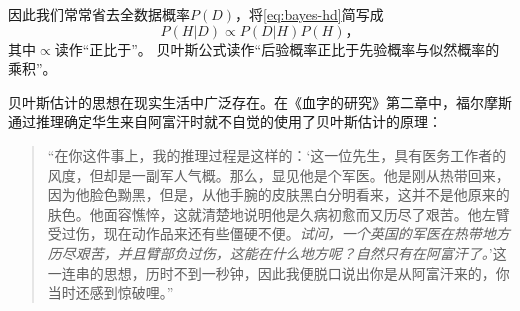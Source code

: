 因此我们常常省去全数据概率$P(D)$，将\cref{eq:bayes-hd}简写成
\begin{equation}\label{eq:bayes-propto}
    P(H|D)\propto P(D|H)P(H)，
\end{equation}
其中$\propto$读作“正比于”。
贝叶斯公式读作“后验概率正比于先验概率与似然概率的乘积”。

贝叶斯估计的思想在现实生活中广泛存在。在《血字的研究》第二章中，福尔摩斯通过推理确定华生来自阿富汗时就不自觉的使用了贝叶斯估计的原理：
\begin{quotation}
    “在你这件事上，我的推理过程是这样的：‘这一位先生，具有医务工作者的风度，但却是一副军人气概。那么，显见他是个军医。他是刚从热带回来，因为他脸色黝黑，但是，从他手腕的皮肤黑白分明看来，这并不是他原来的肤色。他面容憔悴，这就清楚地说明他是久病初愈而又历尽了艰苦。他左臂受过伤，现在动作品来还有些僵硬不便。\emph{试问，一个英国的军医在热带地方历尽艰苦，并且臂部负过伤，这能在什么地方呢？自然只有在阿富汗了。}’这一连串的思想，历时不到一秒钟，因此我便脱口说出你是从阿富汗来的，你当时还感到惊破哩。”
\end{quotation}

